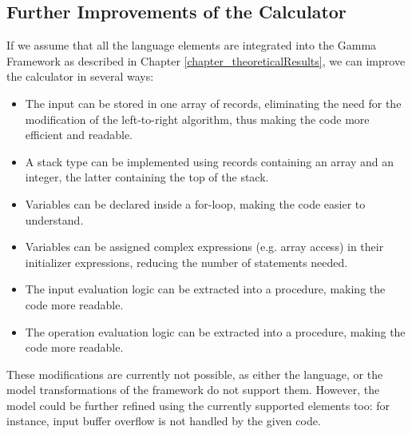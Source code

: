 \subsection{Further Improvements of the Calculator} \label{ss_res_rpn_improvement}
If we assume that all the language elements are integrated into the Gamma Framework as described in Chapter \ref{chapter_theoreticalResults}, we can improve the calculator in several ways: 
\begin{itemize}
	\item The input can be stored in one array of records, eliminating the need for the modification of the left-to-right algorithm, thus making the code more efficient and readable.
	\item A stack type can be implemented using records containing an array and an integer, the latter containing the top of the stack.
	\item Variables can be declared inside a for-loop, making the code easier to understand.
	\item Variables can be assigned complex expressions (e.g. array access) in their initializer expressions, reducing the number of statements needed.
	\item The input evaluation logic can be extracted into a procedure, making the code more readable.
	\item The operation evaluation logic can be extracted into a procedure, making the code more readable.
\end{itemize}

These modifications are currently not possible, as either the language, or the model transformations of the framework do not support them. However, the model could be further refined using the currently supported elements too: for instance, input buffer overflow is not handled by the given code.
